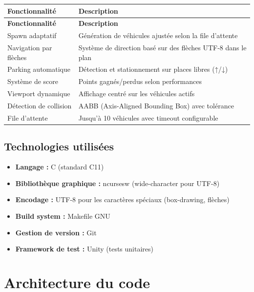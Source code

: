 \documentclass[12pt,a4paper]{article}
\begin{document}
\begin{longtable}{|p{4cm}|p{10cm}|}
\hline
\textbf{Fonctionnalité} & \textbf{Description} \\
\hline
\endfirsthead
\hline
\textbf{Fonctionnalité} & \textbf{Description} \\
\hline
\endhead
\hline
\endfoot
Spawn adaptatif & Génération de véhicules ajustée selon la file d'attente \\
\hline
Navigation par flèches & Système de direction basé sur des flèches UTF-8 dans le plan \\
\hline
Parking automatique & Détection et stationnement sur places libres (↑/↓) \\
\hline
Système de score & Points gagnés/perdus selon performances \\
\hline
Viewport dynamique & Affichage centré sur les véhicules actifs \\
\hline
Détection de collision & AABB (Axis-Aligned Bounding Box) avec tolérance \\
\hline
File d'attente & Jusqu'à 10 véhicules avec timeout configurable \\
\hline
\end{longtable}

\subsection{Technologies utilisées}

\begin{itemize}
    \item \textbf{Langage :} C (standard C11)
    \item \textbf{Bibliothèque graphique :} ncursesw (wide-character pour UTF-8)
    \item \textbf{Encodage :} UTF-8 pour les caractères spéciaux (box-drawing, flèches)
    \item \textbf{Build system :} Makefile GNU
    \item \textbf{Gestion de version :} Git
    \item \textbf{Framework de test :} Unity (tests unitaires)
\end{itemize}


\section{Architecture du code}
\end{document}

